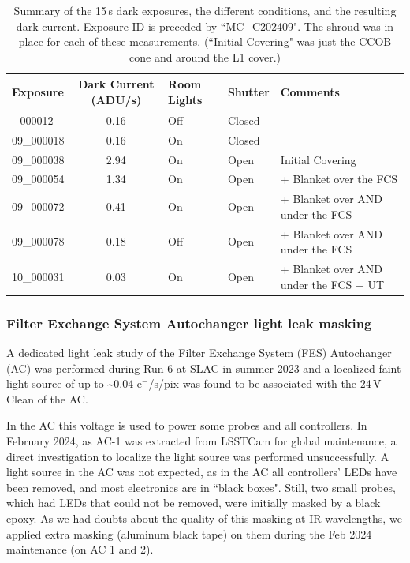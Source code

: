 \begin{longtable}{|l|c|l|l|l|}
\caption{Summary of the 15\,s dark exposures, the different conditions, and the resulting dark current.
Exposure ID is preceded by ``MC\_C202409".  The shroud was in place for each of these measurements.  (``Initial Covering" was just the CCOB cone and around the L1 cover.) \label{tab:leak_chasing}} \\
\hline
\textbf{Exposure} & \textbf{Dark Current} (ADU/s) & \textbf{Room Lights} &\textbf{Shutter} & \textbf{Comments} \\

\hline
\endfirsthead
\hline
\hline
\endhead
\hline
\endfoot
\hline
09\_000012 & 0.16 & Off & Closed & \\
09\_000018 & 0.16 & On & Closed & \\
09\_000038 & 2.94 & On & Open & Initial Covering  \\
09\_000054 & 1.34 & On & Open &  + Blanket over the FCS \\
09\_000072 & 0.41 & On & Open &  + Blanket over AND under the FCS \\
09\_000078 & 0.18 & Off & Open & + Blanket over AND under the FCS \\
10\_000031 & 0.03 & On & Open &  + Blanket over AND under the FCS + UT \\

\end{longtable}


\subsubsection{Filter Exchange System Autochanger light leak
masking}\label{successful-autochanger-light-leaks-masking}

A dedicated light leak study of the Filter Exchange System (FES) Autochanger (AC) was performed during Run 6 at SLAC
in summer 2023 and a localized faint light source of up to
\textasciitilde{}0.04 e$^-$/s/pix was found to be associated with the 24\,V Clean of
the AC.

In the AC this voltage is used to power some probes and all
controllers. In February 2024, as AC-1 was extracted from LSSTCam for
global maintenance, a direct investigation to localize the light
source was performed unsuccessfully. A light source in the AC
was not expected, as in the AC all controllers' LEDs have
been removed, and most electronics are in ``black boxes". Still, two small
probes, which had LEDs that could not be removed, were initially masked
by a black epoxy. As we had doubts about the quality of this masking at
IR wavelengths, we applied extra masking (aluminum black tape) on them during
the Feb 2024 maintenance (on AC 1 and 2).

